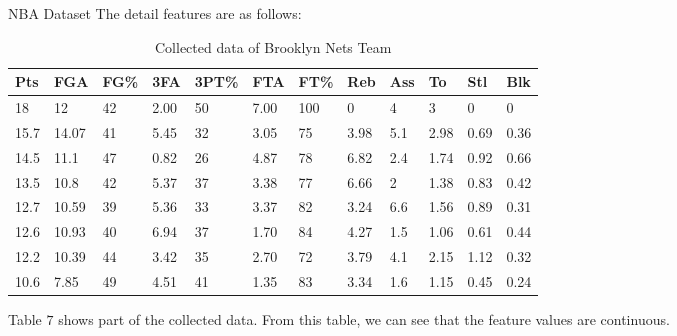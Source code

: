 \documentclass[
size=14pt,
paper=smartboard,  %
mode=present, 		%
display=slides, 	%
style=tuliplab,  	%
pauseslide,
fleqn,leqno]{powerdot}
\begin{document}
\begin{slide}[toc=,bm=]{NBA Dataset}
	The detail features are as follows:
	
	\begin{table}[tb]
		\setlength{\abovecaptionskip}{0pt}
		\setlength{\belowcaptionskip}{10pt}
		\centering
		\caption{Collected data of Brooklyn Nets Team}
		
		\begin{tabular}{p{0.9cm}p{0.9cm}p{0.9cm}p{0.9cm}p{0.9cm}p{0.9cm}p{0.9cm}p{0.9cm}p{0.9cm}p{0.9cm}p{0.9cm}p{0.9cm}}
			\hline
			Pts & FGA & FG\% & 3FA & 3PT\% & FTA & FT\% & Reb & Ass & To & Stl & Blk \\
			\hline
			18   & 12    & 42 &2.00 & 50 & 7.00 & 100& 0& 4& 3& 0& 0 \\
			15.7 & 14.07 & 41 &5.45 & 32 & 3.05 & 75 & 3.98& 5.1& 2.98& 0.69& 0.36\\
			14.5 & 11.1  & 47 &0.82 & 26 & 4.87 & 78 & 6.82& 2.4& 1.74& 0.92& 0.66 \\
			13.5 & 10.8  & 42 &5.37 & 37 & 3.38 & 77 & 6.66& 2& 1.38& 0.83& 0.42 \\
			12.7 & 10.59 & 39 &5.36 & 33 & 3.37 & 82 & 3.24& 6.6& 1.56& 0.89& 0.31 \\
			12.6 & 10.93 & 40 &6.94 & 37 & 1.70 & 84 & 4.27& 1.5& 1.06& 0.61& 0.44 \\
			12.2 & 10.39 & 44 &3.42 & 35 & 2.70 & 72 & 3.79& 4.1& 2.15& 1.12& 0.32 \\
			10.6 & 7.85  & 49 &4.51 & 41 & 1.35 & 83 & 3.34& 1.6& 1.15 & 0.45& 0.24 \\
			\hline
		\end{tabular}
	\end{table}
	
	\begin{note}
		Table $7$ shows part of the collected data.
		From this table,
		we can see that the feature values are continuous.
	\end{note}
	
\end{slide}
\end{document}
